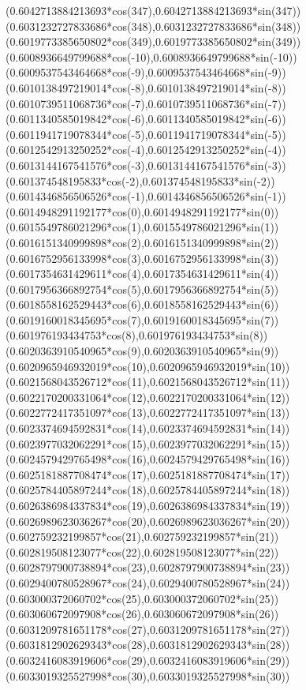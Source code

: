{({0.6042713884213693*cos(347)},{0.6042713884213693*sin(347)})
({0.6031232727833686*cos(348)},{0.6031232727833686*sin(348)})
({0.6019773385650802*cos(349)},{0.6019773385650802*sin(349)})
({0.6008936649799688*cos(-10)},{0.6008936649799688*sin(-10)})
({0.6009537543464668*cos(-9)},{0.6009537543464668*sin(-9)})
({0.6010138497219014*cos(-8)},{0.6010138497219014*sin(-8)})
({0.6010739511068736*cos(-7)},{0.6010739511068736*sin(-7)})
({0.6011340585019842*cos(-6)},{0.6011340585019842*sin(-6)})
({0.6011941719078344*cos(-5)},{0.6011941719078344*sin(-5)})
({0.6012542913250252*cos(-4)},{0.6012542913250252*sin(-4)})
({0.6013144167541576*cos(-3)},{0.6013144167541576*sin(-3)})
({0.601374548195833*cos(-2)},{0.601374548195833*sin(-2)})
({0.6014346856506526*cos(-1)},{0.6014346856506526*sin(-1)})
({0.6014948291192177*cos(0)},{0.6014948291192177*sin(0)})
({0.6015549786021296*cos(1)},{0.6015549786021296*sin(1)})
({0.6016151340999898*cos(2)},{0.6016151340999898*sin(2)})
({0.6016752956133998*cos(3)},{0.6016752956133998*sin(3)})
({0.6017354631429611*cos(4)},{0.6017354631429611*sin(4)})
({0.6017956366892754*cos(5)},{0.6017956366892754*sin(5)})
({0.6018558162529443*cos(6)},{0.6018558162529443*sin(6)})
({0.6019160018345695*cos(7)},{0.6019160018345695*sin(7)})
({0.601976193434753*cos(8)},{0.601976193434753*sin(8)})
({0.6020363910540965*cos(9)},{0.6020363910540965*sin(9)})
({0.6020965946932019*cos(10)},{0.6020965946932019*sin(10)})
({0.6021568043526712*cos(11)},{0.6021568043526712*sin(11)})
({0.6022170200331064*cos(12)},{0.6022170200331064*sin(12)})
({0.6022772417351097*cos(13)},{0.6022772417351097*sin(13)})
({0.6023374694592831*cos(14)},{0.6023374694592831*sin(14)})
({0.6023977032062291*cos(15)},{0.6023977032062291*sin(15)})
({0.6024579429765498*cos(16)},{0.6024579429765498*sin(16)})
({0.6025181887708474*cos(17)},{0.6025181887708474*sin(17)})
({0.6025784405897244*cos(18)},{0.6025784405897244*sin(18)})
({0.6026386984337834*cos(19)},{0.6026386984337834*sin(19)})
({0.6026989623036267*cos(20)},{0.6026989623036267*sin(20)})
({0.602759232199857*cos(21)},{0.602759232199857*sin(21)})
({0.602819508123077*cos(22)},{0.602819508123077*sin(22)})
({0.6028797900738894*cos(23)},{0.6028797900738894*sin(23)})
({0.6029400780528967*cos(24)},{0.6029400780528967*sin(24)})
({0.603000372060702*cos(25)},{0.603000372060702*sin(25)})
({0.603060672097908*cos(26)},{0.603060672097908*sin(26)})
({0.6031209781651178*cos(27)},{0.6031209781651178*sin(27)})
({0.6031812902629343*cos(28)},{0.6031812902629343*sin(28)})
({0.6032416083919606*cos(29)},{0.6032416083919606*sin(29)})
({0.6033019325527998*cos(30)},{0.6033019325527998*sin(30)})
}
